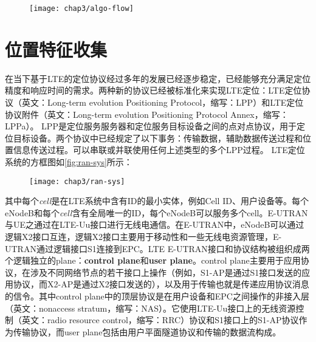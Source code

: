 \begin{figure}[!htp]
    \centering
    \texttt{[image: chap3/algo-flow]}
\end{figure}

\section{位置特征收集}

在当下基于LTE的定位协议经过多年的发展已经逐步稳定，已经能够充分满足定位精度和响应时间的需求。两种新的协议已经被标准化来实现LTE定位：LTE定位协议（英文：Long-term evolution Positioning Protocol，缩写：LPP）\cite{lpp}和LTE定位协议附件（英文：Long-term evolution Positioning Protocol Annex，缩写：LPPa）\cite{lppa}。 LPP是定位服务服务器和定位服务目标设备之间的点对点协议，用于定位目标设备。两个协议中已经规定了以下事务：传输数据，辅助数据传送过程和位置信息传送过程。可以串联或并联使用任何上述类型的多个LPP过程。 LTE定位系统的方框图如\ref{fig:ran-sys}所示：

\begin{figure}[!htp]
    \centering
    \texttt{[image: chap3/ran-sys]}
\end{figure}
其中每个\textit{cell}是在LTE系统中含有ID的最小实体，例如Cell ID、用户设备等。每个eNodeB和每个\textit{cell}含有全局唯一的ID，每个eNodeB可以服务多个cell。E-UTRAN与UE之通过在LTE-Uu接口进行无线电通信。在E-UTRAN中，eNodeB可以通过逻辑X2接口互连，逻辑X2接口主要用于移动性和一些无线电资源管理，E-UTRAN通过逻辑接口S1连接到EPC。LTE E-UTRAN接口和协议结构被组织成两个逻辑独立的plane：\textbf{control plane}和\textbf{user plane}。control plane主要用于应用协议，在涉及不同网络节点的若干接口上操作（例如，S1-AP\cite{s1ap}是通过S1接口发送的应用协议，而X2-AP\cite{x2ap}是通过X2接口发送的），以及用于传输也就是传递应用协议消息的信令。其中control plane中的顶层协议是在用户设备和EPC之间操作的非接入层（英文：nonaccess stratum，缩写：NAS）。它使用LTE-Uu接口上的无线资源控制（英文：radio resource control，缩写：RRC）协议和S1接口上的S1-AP协议作为传输协议，而user plane包括由用户平面隧道协议和传输的数据流构成。

